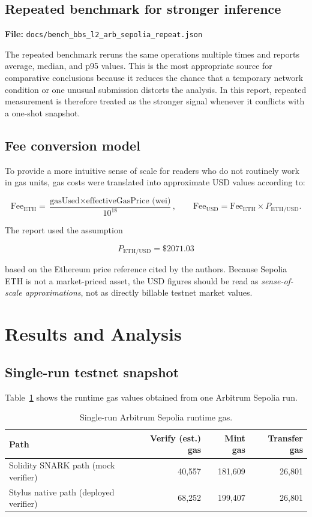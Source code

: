 \documentclass[11pt]{article}
\begin{document}
\subsection{Repeated benchmark for stronger inference}
\textbf{File:} \texttt{docs/bench\_bbs\_l2\_arb\_sepolia\_repeat.json}

The repeated benchmark reruns the same operations multiple times and reports average, median, and p95 values. This is the most appropriate source for comparative conclusions because it reduces the chance that a temporary network condition or one unusual submission distorts the analysis. In this report, repeated measurement is therefore treated as the stronger signal whenever it conflicts with a one-shot snapshot.

\subsection{Fee conversion model}
To provide a more intuitive sense of scale for readers who do not routinely work in gas units, gas costs were translated into approximate USD values according to:

\[
\text{Fee}_{\mathrm{ETH}} = \frac{\text{gasUsed} \times \text{effectiveGasPrice (wei)}}{10^{18}},
\qquad
\text{Fee}_{\mathrm{USD}} = \text{Fee}_{\mathrm{ETH}} \times P_{\mathrm{ETH/USD}}.
\]

The report used the assumption

\[
P_{\mathrm{ETH/USD}} = \$2071.03
\]

based on the Ethereum price reference cited by the authors. Because Sepolia ETH is not a market-priced asset, the USD figures should be read as \emph{sense-of-scale approximations}, not as directly billable testnet market values.

\section{Results and Analysis}

\subsection{Single-run testnet snapshot}
Table~\ref{tab:single-run} shows the runtime gas values obtained from one Arbitrum Sepolia run.

\begin{table}[htbp]
\centering
\small
\caption{Single-run Arbitrum Sepolia runtime gas.}
\label{tab:single-run}
\begin{tabular}{lrrr}
\toprule
\textbf{Path} & \textbf{Verify (est.) gas} & \textbf{Mint gas} & \textbf{Transfer gas} \\
\midrule
Solidity SNARK path (mock verifier) & 40,557 & 181,609 & 26,801 \\
Stylus native path (deployed verifier) & 68,252 & 199,407 & 26,801 \\
\bottomrule
\end{tabular}
\end{table}
\end{document}
